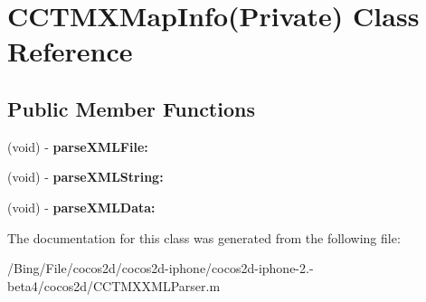 \hypertarget{interface_c_c_t_m_x_map_info_07_private_08}{\section{C\-C\-T\-M\-X\-Map\-Info(Private) Class Reference}
\label{interface_c_c_t_m_x_map_info_07_private_08}
}
\subsection*{Public Member Functions}
\begin{DoxyCompactItemize}
\item 
\hypertarget{interface_c_c_t_m_x_map_info_07_private_08_aa427641dff186658d7e3bc2caa981238}{(void) -\/ {\bfseries parse\-X\-M\-L\-File\-:}}\label{interface_c_c_t_m_x_map_info_07_private_08_aa427641dff186658d7e3bc2caa981238}

\item 
\hypertarget{interface_c_c_t_m_x_map_info_07_private_08_a3340f992735f64d918fff063b58f15d1}{(void) -\/ {\bfseries parse\-X\-M\-L\-String\-:}}\label{interface_c_c_t_m_x_map_info_07_private_08_a3340f992735f64d918fff063b58f15d1}

\item 
\hypertarget{interface_c_c_t_m_x_map_info_07_private_08_aff64ffbeeed3e2fabf1c1373844c2b7b}{(void) -\/ {\bfseries parse\-X\-M\-L\-Data\-:}}\label{interface_c_c_t_m_x_map_info_07_private_08_aff64ffbeeed3e2fabf1c1373844c2b7b}

\end{DoxyCompactItemize}


The documentation for this class was generated from the following file\-:\begin{DoxyCompactItemize}
\item 
/\-Bing/\-File/cocos2d/cocos2d-\/iphone/cocos2d-\/iphone-\/2.-\/beta4/cocos2d/C\-C\-T\-M\-X\-X\-M\-L\-Parser.\-m\end{DoxyCompactItemize}
